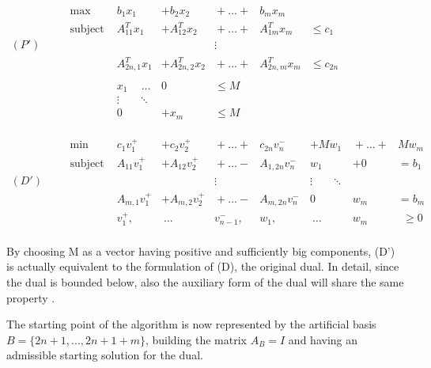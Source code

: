 \documentclass[journal,article,submit,electronics,pdftex]{Definitions/mdpi}
\begin{document}
{\begin{equation}
\begin{array}{llllcllllll}\label{eq:auxiliary}
& \text{max}         & b_1 x_1  & + b_2 x_2   & {}+{\dots}+{} & b_m x_m  \\
& \text{subject to } & A_{11}^Tx_1 & + A_{12}^Tx_2 & {}+{\dots}+{} & A_{1m}^Tx_m & \leq c_1\\
(P')\hspace{20pt}&             &             &               &\vdots         &\\
& & A_{2n,1}^Tx_1 & + A_{2n,2}^Tx_2 & {}+{\dots}+{} & A_{2n,m}^Tx_m & \leq c_{2n}\\\\
& & x_1  \hspace{15pt}{}{\dots}{} &  0 &  \leq M &  & \\
 &            &   \vdots  \hspace{20pt}\ddots         &               &         &\\
& & 0 & +x_m  & \leq M &  & \\
\\\\\\
& \text{min} & c_1 v_1^+  & + c_2 v_2^+   & {}+{\dots}+{} & c_{2n} v_{n}^- 
& + M w_{1} & {}+{\dots}+{} & M w_m \\
& \text{subject to } & A_{11}v_1^+ & + A_{12}v_2^+ & {}+{\dots}-{}  &  A_{1,2n}v_n^- & w_1 & +0 & {} = b_1 \\
(D')\hspace{20pt}&             &             &               &\vdots         &                    &       \vdots  \hspace{20pt} \ddots     &         \\
 &  & A_{m,1}v_1^+ & + A_{m,2}v_2^+ & {}+{\dots}-{} & A_{m, 2n}v_{n}^-  & 0 & w_m & {} = b_{m} \\
 &  & v_1^+,   & {}\:{\dots}\:{}  & v_{n-1}^-,  & w_{1}, & {}\:{\dots}\:{} & w_{m} & \:\:\geq{0}  \\
 
\end{array}
\end{equation}

By choosing M as a vector having positive and sufficiently big components, (D') is actually equivalent to the formulation of (D), the original dual. In detail, since the dual is bounded below, also the auxiliary form of the dual will share the same property \cite{ricercaoperativa}. 

The starting point of the algorithm is now represented by the artificial basis $B = \{2n+1, ..., 2n + 1 + m\}$, building the matrix $A_B = I$ and having an admissible starting solution for the dual. 

}
\end{document}

